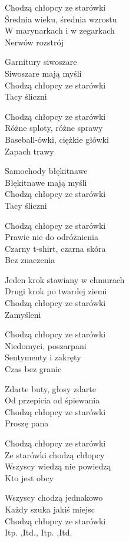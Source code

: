 
\begin{text}
    Chodzą chłopcy ze starówki\\
    Średnia wieku, średnia wzrostu\\
    W marynarkach i w zegarkach\\
    Nerwów rozstrój

    Garnitury siwoszare\\
    Siwoszare mają myśli\\
    Chodzą chłopcy ze starówki\\
    Tacy śliczni

    Chodzą chłopcy ze starówki\\
    Różne sploty, różne sprawy\\
    Baseball-ówki, ciężkie główki\\
    Zapach trawy

    Samochody błękitnawe\\
    Błękitnawe mają myśli\\
    Chodzą chłopcy ze starówki\\
    Tacy śliczni

    Chodzą chłopcy ze starówki\\
    Prawie nie do odróżnienia\\
    Czarny t-shirt, czarna skóra\\
    Bez znaczenia

    Jeden krok stawiany w chmurach\\
    Drugi krok po twardej ziemi\\
    Chodzą chłopcy ze starówki\\
    Zamyśleni

    Chodzą chłopcy ze starówki\\
    Niedomyci, poszarpani\\
    Sentymenty i zakręty\\
    Czas bez granic

    Zdarte buty, głosy zdarte\\
    Od przepicia od śpiewania\\
    Chodzą chłopcy ze starówki\\
    Proszę pana

    Chodzą chłopcy ze starówki\\
    Ze starówki chodzą chłopcy\\
    Wszyscy wiedzą nie powiedzą\\
    Kto jest obcy

    Wszyscy chodzą jednakowo\\
    Każdy szuka jakiś miejsc\\
    Chodzą chłopcy ze starówki\\
    Itp. ,Itd., Itp. ,Itd.
\end{text}
\begin{chord}

\end{chord}